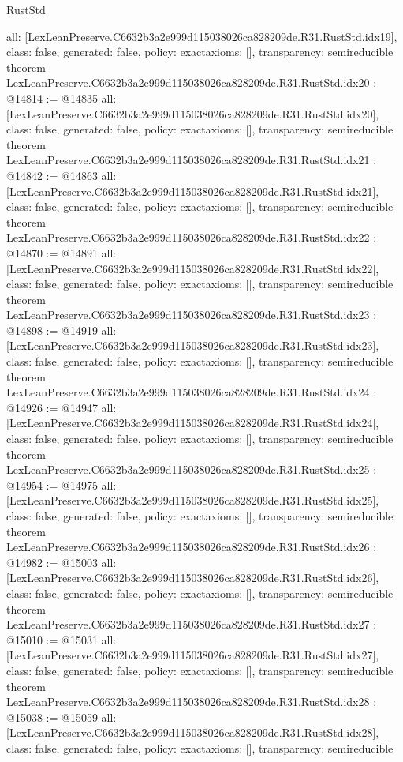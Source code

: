 \begin{lexlean}{RustStd}
\begin{coremodule}
{  all: [LexLeanPreserve.C6632b3a2e999d115038026ca828209de.R31.RustStd.idx19],
  class: false,
  generated: false,
  policy: exact{axioms: []},
  transparency: semireducible
}
theorem LexLeanPreserve.C6632b3a2e999d115038026ca828209de.R31.RustStd.idx20 : @14814 := @14835 {
  all: [LexLeanPreserve.C6632b3a2e999d115038026ca828209de.R31.RustStd.idx20],
  class: false,
  generated: false,
  policy: exact{axioms: []},
  transparency: semireducible
}
theorem LexLeanPreserve.C6632b3a2e999d115038026ca828209de.R31.RustStd.idx21 : @14842 := @14863 {
  all: [LexLeanPreserve.C6632b3a2e999d115038026ca828209de.R31.RustStd.idx21],
  class: false,
  generated: false,
  policy: exact{axioms: []},
  transparency: semireducible
}
theorem LexLeanPreserve.C6632b3a2e999d115038026ca828209de.R31.RustStd.idx22 : @14870 := @14891 {
  all: [LexLeanPreserve.C6632b3a2e999d115038026ca828209de.R31.RustStd.idx22],
  class: false,
  generated: false,
  policy: exact{axioms: []},
  transparency: semireducible
}
theorem LexLeanPreserve.C6632b3a2e999d115038026ca828209de.R31.RustStd.idx23 : @14898 := @14919 {
  all: [LexLeanPreserve.C6632b3a2e999d115038026ca828209de.R31.RustStd.idx23],
  class: false,
  generated: false,
  policy: exact{axioms: []},
  transparency: semireducible
}
theorem LexLeanPreserve.C6632b3a2e999d115038026ca828209de.R31.RustStd.idx24 : @14926 := @14947 {
  all: [LexLeanPreserve.C6632b3a2e999d115038026ca828209de.R31.RustStd.idx24],
  class: false,
  generated: false,
  policy: exact{axioms: []},
  transparency: semireducible
}
theorem LexLeanPreserve.C6632b3a2e999d115038026ca828209de.R31.RustStd.idx25 : @14954 := @14975 {
  all: [LexLeanPreserve.C6632b3a2e999d115038026ca828209de.R31.RustStd.idx25],
  class: false,
  generated: false,
  policy: exact{axioms: []},
  transparency: semireducible
}
theorem LexLeanPreserve.C6632b3a2e999d115038026ca828209de.R31.RustStd.idx26 : @14982 := @15003 {
  all: [LexLeanPreserve.C6632b3a2e999d115038026ca828209de.R31.RustStd.idx26],
  class: false,
  generated: false,
  policy: exact{axioms: []},
  transparency: semireducible
}
theorem LexLeanPreserve.C6632b3a2e999d115038026ca828209de.R31.RustStd.idx27 : @15010 := @15031 {
  all: [LexLeanPreserve.C6632b3a2e999d115038026ca828209de.R31.RustStd.idx27],
  class: false,
  generated: false,
  policy: exact{axioms: []},
  transparency: semireducible
}
theorem LexLeanPreserve.C6632b3a2e999d115038026ca828209de.R31.RustStd.idx28 : @15038 := @15059 {
  all: [LexLeanPreserve.C6632b3a2e999d115038026ca828209de.R31.RustStd.idx28],
  class: false,
  generated: false,
  policy: exact{axioms: []},
  transparency: semireducible
}
\end{coremodule}
\end{lexlean}

